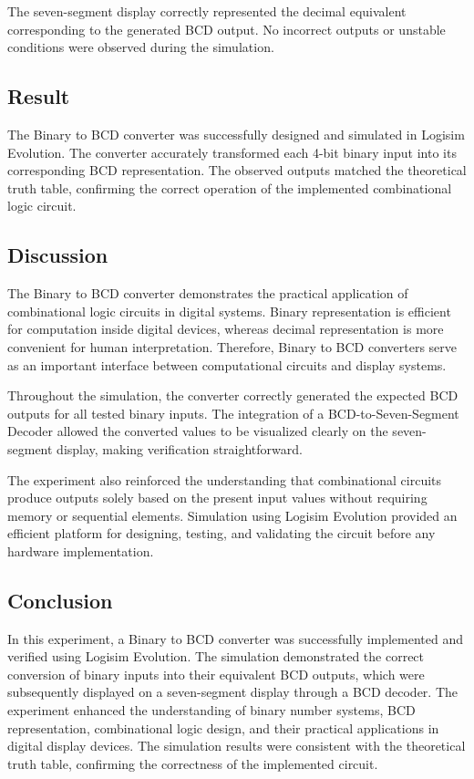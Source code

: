 \documentclass[12pt,a4paper]{article}
\begin{document}
The seven-segment display correctly represented the decimal equivalent corresponding to the generated BCD output. No incorrect outputs or unstable conditions were observed during the simulation.

\subsection{Result}

The Binary to BCD converter was successfully designed and simulated in Logisim Evolution. The converter accurately transformed each 4-bit binary input into its corresponding BCD representation. The observed outputs matched the theoretical truth table, confirming the correct operation of the implemented combinational logic circuit.

\subsection{Discussion}

The Binary to BCD converter demonstrates the practical application of combinational logic circuits in digital systems. Binary representation is efficient for computation inside digital devices, whereas decimal representation is more convenient for human interpretation. Therefore, Binary to BCD converters serve as an important interface between computational circuits and display systems.

Throughout the simulation, the converter correctly generated the expected BCD outputs for all tested binary inputs. The integration of a BCD-to-Seven-Segment Decoder allowed the converted values to be visualized clearly on the seven-segment display, making verification straightforward.

The experiment also reinforced the understanding that combinational circuits produce outputs solely based on the present input values without requiring memory or sequential elements. Simulation using Logisim Evolution provided an efficient platform for designing, testing, and validating the circuit before any hardware implementation.

\subsection{Conclusion}

In this experiment, a Binary to BCD converter was successfully implemented and verified using Logisim Evolution. The simulation demonstrated the correct conversion of binary inputs into their equivalent BCD outputs, which were subsequently displayed on a seven-segment display through a BCD decoder. The experiment enhanced the understanding of binary number systems, BCD representation, combinational logic design, and their practical applications in digital display devices. The simulation results were consistent with the theoretical truth table, confirming the correctness of the implemented circuit.
\end{document}

